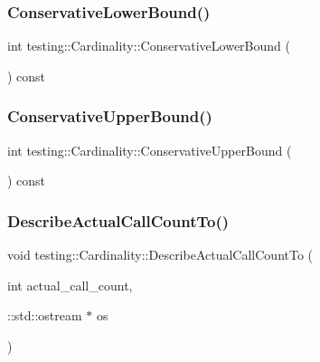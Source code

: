 \subsubsection{\texorpdfstring{Conservative\+Lower\+Bound()}{ConservativeLowerBound()}}
{\footnotesize\ttfamily int testing\+::\+Cardinality\+::\+Conservative\+Lower\+Bound (\begin{DoxyParamCaption}{ }\end{DoxyParamCaption}) const\hspace{0.3cm}{\ttfamily [inline]}}

\mbox{\label{classtesting_1_1_cardinality_acb42e3683f99b986f3ac538b5eefbc31}} 
\subsubsection{\texorpdfstring{Conservative\+Upper\+Bound()}{ConservativeUpperBound()}}
{\footnotesize\ttfamily int testing\+::\+Cardinality\+::\+Conservative\+Upper\+Bound (\begin{DoxyParamCaption}{ }\end{DoxyParamCaption}) const\hspace{0.3cm}{\ttfamily [inline]}}

\mbox{\label{classtesting_1_1_cardinality_a7cbea339e2f3072a98367e087aa296e8}} 
\subsubsection{\texorpdfstring{Describe\+Actual\+Call\+Count\+To()}{DescribeActualCallCountTo()}}
{\footnotesize\ttfamily void testing\+::\+Cardinality\+::\+Describe\+Actual\+Call\+Count\+To (\begin{DoxyParamCaption}\item[{int}]{actual\+\_\+call\+\_\+count,  }\item[{\+::std\+::ostream $\ast$}]{os }\end{DoxyParamCaption})\hspace{0.3cm}{\ttfamily [static]}}

